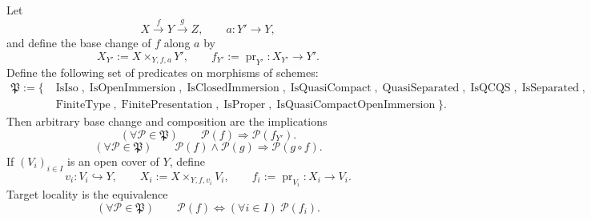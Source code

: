 \begin{lemma}
  \label{lemma:nagata-morphism-property-calculus}

  Let
  \[
    X\xrightarrow{f}Y\xrightarrow{g}Z,
    \qquad a\colon Y'\to Y,
  \]
  and define the base change of $f$ along $a$ by
  \[
    X_{Y'}:=X\times_{Y,f,a}Y',
    \qquad
    f_{Y'}:=\operatorname{pr}_{Y'}\colon X_{Y'}\to Y'.             \tag{PC0}
  \]
  Define the following set of predicates on morphisms of schemes:
  \[
  \begin{split}
    \mathfrak P:=\{&\operatorname{IsIso},
      \operatorname{IsOpenImmersion},
      \operatorname{IsClosedImmersion},
      \operatorname{IsQuasiCompact},
      \operatorname{QuasiSeparated},
      \operatorname{IsQCQS},
      \operatorname{IsSeparated},\\
      &\operatorname{FiniteType},
      \operatorname{FinitePresentation},
      \operatorname{IsProper},
      \operatorname{IsQuasiCompactOpenImmersion}\}.
  \end{split}                                                       \tag{PC1}
  \]
  Then arbitrary base change and composition are the implications
  \[
    (\forall\mathcal P\in\mathfrak P)\qquad
      \mathcal P(f)\Longrightarrow\mathcal P(f_{Y'}).             \tag{PC2}
  \]
  \[
    (\forall\mathcal P\in\mathfrak P)\qquad
      \mathcal P(f)\wedge\mathcal P(g)
        \Longrightarrow\mathcal P(g\circ f).                     \tag{PC3}
  \]
  If $(V_i)_{i\in I}$ is an open cover of $Y$, define
  \[
    v_i\colon V_i\hookrightarrow Y,
    \qquad
    X_i:=X\times_{Y,f,v_i}V_i,
    \qquad
    f_i:=\operatorname{pr}_{V_i}\colon X_i\to V_i.                \tag{PC4}
  \]
  Target locality is the equivalence
  \[
    (\forall\mathcal P\in\mathfrak P)\qquad
    \mathcal P(f)
      \Longleftrightarrow
    (\forall i\in I)\ \mathcal P(f_i).                            \tag{PC5}
  \]


\end{lemma}
